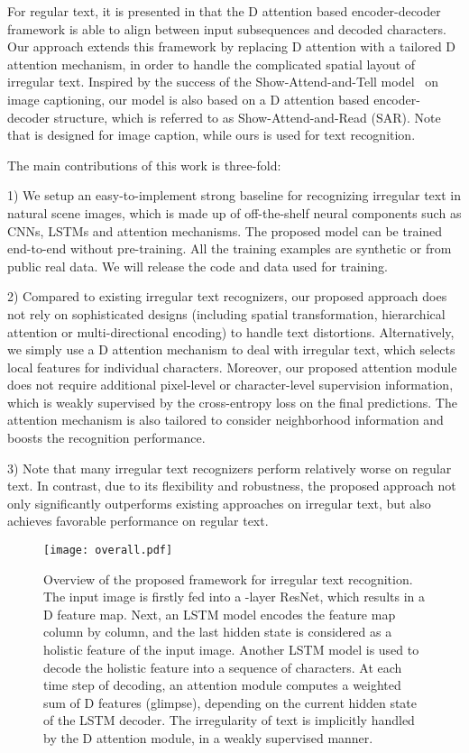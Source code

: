 \documentclass[letterpaper]{article} \usepackage{aaai19}  \usepackage{times}  \usepackage{helvet}  \usepackage{courier}  \usepackage{url}  \usepackage{graphicx}  \usepackage{amsmath}
\begin{document}
For regular text,
it is presented in \cite{Lee_2016_CVPR,shiCVPR2016} that the D attention based encoder-decoder framework is able to align between input subsequences and decoded characters.
Our approach extends this framework by replacing D attention with a tailored D attention mechanism,
in order to handle the complicated spatial layout of irregular text.
Inspired by the success of the Show-Attend-and-Tell model~\cite{xu2015show} on image captioning,
our model is also based on a D attention based encoder-decoder structure, which is referred to as Show-Attend-and-Read (SAR).
Note that \cite{xu2015show} is designed for image caption, while ours is used for text recognition.


The main contributions of this work is three-fold:

1)	We setup an easy-to-implement strong baseline for recognizing irregular text in natural scene images,
which is made up of off-the-shelf neural components such as CNNs, LSTMs and attention mechanisms.
The proposed model can be trained end-to-end without pre-training.
All the training examples are synthetic or from public real data.
We will release the code and data used for training.

2) Compared to existing irregular text recognizers, our proposed approach does not rely on sophisticated designs (including spatial transformation,
hierarchical attention or multi-directional encoding) to handle text distortions.
Alternatively, we simply use a D attention mechanism to deal with irregular text, which selects local features for individual characters.
Moreover, our proposed attention module does not require additional pixel-level or character-level supervision information,
which is weakly supervised by the cross-entropy loss on the final predictions.
The attention mechanism is also tailored to consider neighborhood information and boosts the recognition performance.

3) Note that many irregular text recognizers perform relatively worse on regular text. In contrast, due to its flexibility and robustness,
the proposed approach not only significantly outperforms existing approaches on irregular text, but also achieves favorable performance on regular text.

\begin{figure*}[t]
	\begin{center}
		\texttt{[image: overall.pdf]}
	\end{center}
	\caption{ Overview of the proposed framework for irregular text recognition. The input image  is firstly fed into a -layer
		ResNet, which results in a D feature map. Next, an LSTM model encodes the feature map column by column, and the last hidden state is considered as a holistic feature of the input image. Another LSTM model is used to decode the holistic feature into a sequence of characters. At each time step of decoding, an attention module computes a weighted sum of D features (glimpse), depending on the current hidden state of the LSTM decoder. The irregularity of text is implicitly handled by the D attention module, in a weakly supervised manner.
	}
	\label{fig:framework}
\end{figure*}
\end{document}
